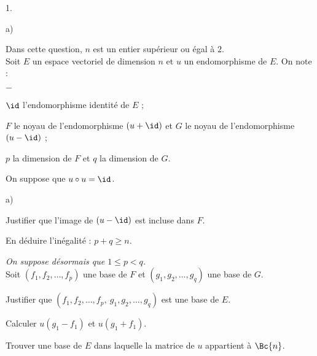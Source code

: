 \begin{noliste}{1.}
\begin{noliste}{a)}
    
  \end{noliste}



  
\item Dans cette question, $n$ est un entier supérieur ou égal à $2$.\\
  Soit $E$ un espace vectoriel de dimension $n$ et $u$ un
  endomorphisme de $E$. On note :
  \begin{noliste}{$-$}
  \item $\id$ l'endomorphisme identité de $E$ ;
  \item $F$ le noyau de l'endomorphisme $(u+\id)$ et $G$ le noyau de
    l'endomorphisme $(u-\id)$ ;
  \item $p$ la dimension de $F$ et $q$ la dimension de $G$.
  \end{noliste}
  On suppose que $u \circ u =\id$.
  \begin{noliste}{a)}
    \setlength{\itemsep}{2mm}
  \item Justifier que l'image de $(u-\id)$ est incluse dans $F$.
	
    
    
  \item En déduire l'inégalité : $p + q \geq n$.
    
    
    {\it On suppose désormais que $1\leq p<q$.}\\
    Soit $(f_1, f_2, \ldots, f_p)$ une base de $F$ et $(g_1, g_2,
    \ldots, g_q)$ une base de $G$.

  \item Justifier que $(f_1, f_2, \hdots, f_p, \ g_1,g_2,\hdots,g_q)$
    est une base de $E$.
    
    
  
  \item Calculer $u(g_1-f_1)$ et $u(g_1+f_1)$.
    
    
    
  \item Trouver une base de $E$ dans laquelle la matrice de $u$
    appartient à $\Bc{n}$.
	

\end{noliste}
\end{noliste}
